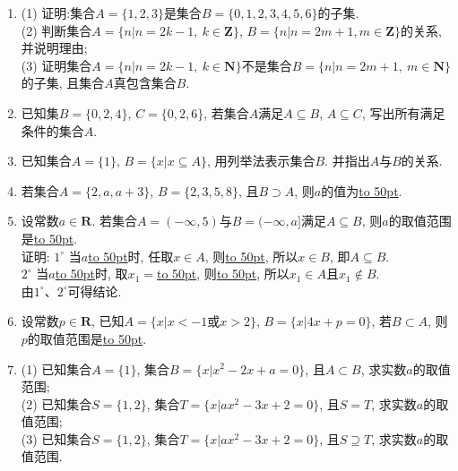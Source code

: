 \documentclass[10pt,a4paper]{article}
\newcommand{\blank}[1]{\underline{\hbox to #1pt{}}}
\begin{document}
\begin{enumerate}[1.]
\item (1) 证明:集合$A=\{1,2,3\}$是集合$B=\{0,1,2,3,4,5,6\}$的子集.\\
(2) 判断集合$A=\{n|n=2k-1,\ k\in \mathbf{Z}\}$, $B=\{n|n=2m+1,m\in \mathbf{Z}\}$的关系, 并说明理由;\\
(3) 证明集合$A=\{n|n=2k-1,\ k\in \mathbf{N}\}$不是集合$B=\{n|n=2m+1, \ m\in \mathbf{N}\}$的子集, 且集合$A$真包含集合$B$.
\item 已知集$B=\{0, 2, 4\}$, $C=\{0, 2, 6\}$, 若集合$A$满足$A\subseteq B$, $A\subseteq C$, 写出所有满足条件的集合$A$.
\item 已知集合$A=\{1\}$, $B=\{x|x\subseteq A\}$, 用列举法表示集合$B$. 并指出$A$与$B$的关系.
\item 若集合$A=\{2,a,a+3\}$, $B=\{2,3,5,8\}$, 且$B\supset A$, 则$a$的值为\blank{50}.
\item 设常数$a\in \mathbf{R}$. 若集合$A=(-\infty ,5)$与$B=(-\infty ,a]$满足$A\subseteq B$, 则$a$的取值范围是\blank{50}.\\
证明: $1^\circ$ 当$a$\blank{50}时, 任取$x\in A$, 则\blank{50}, 所以$x\in B$, 即$A\subseteq B$.\\ 
$2^\circ$ 当$a$\blank{50}时, 取$x_1=$\blank{50}, 则\blank{50}, 所以$x_1\in A$且$x_1\not \in B$.\\
由$1^\circ$、$2^\circ$可得结论.
\item 设常数$p\in\mathbf{R}$, 已知$A=\{x|x<-1$或$x>2\}$, $B=\{x|4x+p=0\}$, 若$B\subset A$, 则$p$的取值范围是\blank{50}.
\item (1) 已知集合$A=\{1\}$, 集合$B=\{x|x^2-2x+a=0\}$, 且$A\subset B$, 求实数$a$的取值范围;\\
(2) 已知集合$S=\{1, 2\}$, 集合$T=\{x|ax^2-3x+2=0\}$, 且$S=T$, 求实数$a$的取值范围;\\
(3) 已知集合$S=\{1, 2\}$, 集合$T=\{x|ax^2-3x+2=0\}$, 且$S\supseteq T$, 求实数$a$的取值范围.


\iffalse









\end{enumerate}
\end{document}
